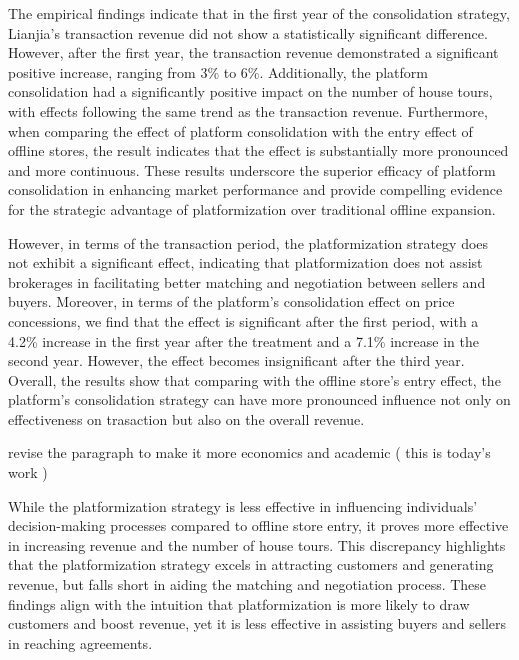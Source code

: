 \documentclass[11pt]{article}
\begin{document}
The empirical findings indicate that in the first year of the consolidation strategy, Lianjia's transaction revenue did not show a statistically significant difference. However, after the first year, the transaction revenue demonstrated a significant positive increase, ranging from 3\% to 6\%. Additionally, the platform consolidation had a significantly positive impact on the number of house tours, with effects following the same trend as the transaction revenue. Furthermore, when comparing the effect of platform consolidation with the entry effect of offline stores, the result indicates that the effect is substantially more pronounced and more continuous. These results underscore the superior efficacy of platform consolidation in enhancing market performance and provide compelling evidence for the strategic advantage of platformization over traditional offline expansion.

However, in terms of the transaction period, the platformization strategy does not exhibit a significant effect, indicating that platformization does not assist brokerages in facilitating better matching and negotiation between sellers and buyers. Moreover, in terms of the platform's consolidation effect on price concessions, we find that the effect is significant after the first period, with a 4.2\% increase in the first year after the treatment and a 7.1\% increase in the second year. However, the effect becomes insignificant after the third year. Overall, the results show that comparing with the offline store's entry effect, the platform's consolidation strategy can have more pronounced influence not only on effectiveness on trasaction but also on the overall revenue.

revise the paragraph to make it more economics and academic
( this is today's work )

While the platformization strategy is less effective in influencing individuals' decision-making processes compared to offline store entry, it proves more effective in increasing revenue and the number of house tours. This discrepancy highlights that the platformization strategy excels in attracting customers and generating revenue, but falls short in aiding the matching and negotiation process. These findings align with the intuition that platformization is more likely to draw customers and boost revenue, yet it is less effective in assisting buyers and sellers in reaching agreements.
\end{document}
